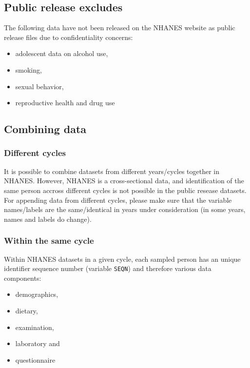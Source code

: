 \documentclass[
]{book}
\providecommand{\tightlist}{%
  \setlength{\itemsep}{0pt}\setlength{\parskip}{0pt}}
\begin{document}
\hypertarget{public-release-excludes}{%
\subsection{Public release excludes}\label{public-release-excludes}}

The following data have not been released on the NHANES website as public release files due to confidentiality concerns:

\begin{itemize}
\tightlist
\item
  adolescent data on alcohol use,
\item
  smoking,
\item
  sexual behavior,
\item
  reproductive health and drug use
\end{itemize}

\hypertarget{combining-data}{%
\subsection{Combining data}\label{combining-data}}

\hypertarget{different-cycles}{%
\subsubsection{Different cycles}\label{different-cycles}}

It is possible to combine datasets from different years/cycles together in NHANES. However, NHANES is a cross-sectional data, and identification of the same person accross different cycles is not possible in the public resease datasets. For appending data from different cycles, please make sure that the variable names/labels are the same/identical in years under consideration (in some years, names and labels do change).

\hypertarget{within-the-same-cycle}{%
\subsubsection{Within the same cycle}\label{within-the-same-cycle}}

Within NHANES datasets in a given cycle, each sampled person has an unique identifier sequence number (variable \texttt{SEQN}) and therefore various data components:

\begin{itemize}
\tightlist
\item
  demographics,
\item
  dietary,
\item
  examination,
\item
  laboratory and
\item
  questionnaire
\end{itemize}
\end{document}
